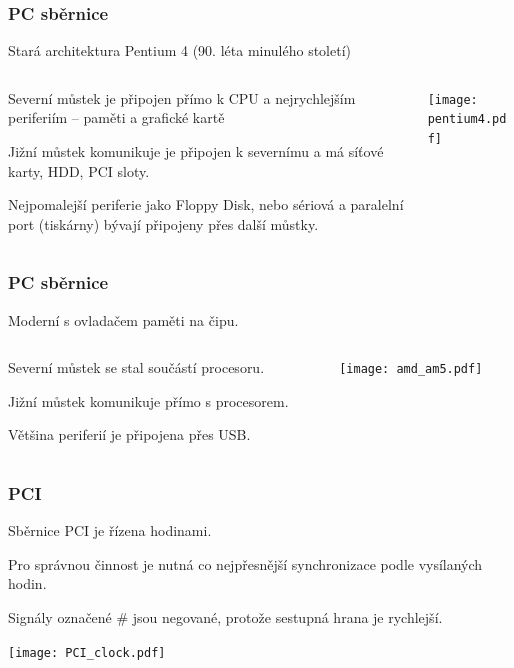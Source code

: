 \documentclass{beamer}
\begin{document}
\begin{frame}
\frametitle{PC sběrnice}
\begin{center}
Stará architektura Pentium 4 (90. léta minulého století)
\end{center}

\begin{columns}
\begin{column}{0.5\textwidth}
Severní můstek je připojen přímo k CPU a nejrychlejším periferiím -- paměti a grafické kartě
\bigskip

Jižní můstek komunikuje je připojen k severnímu a má síťové karty, HDD, PCI sloty.

\bigskip
Nejpomalejší periferie jako Floppy Disk, nebo sériová a paralelní port (tiskárny) bývají připojeny přes další můstky.
\end{column}
\begin{column}{0.5\textwidth}  
\texttt{[image: pentium4.pdf]}
\end{column}
\end{columns}
\end{frame}

\begin{frame}
\frametitle{PC sběrnice}

\begin{center}
Moderní s ovladačem paměti na čipu.
\end{center}

\begin{columns}
\begin{column}{0.4\textwidth}
Severní můstek se stal součástí procesoru.

\bigskip
Jižní můstek komunikuje přímo s procesorem.

\bigskip
Většina periferií je připojena přes USB.
\end{column}
\begin{column}{0.6\textwidth}  
\texttt{[image: amd\_am5.pdf]}
\end{column}
\end{columns}
\end{frame}

\begin{frame}
\frametitle{PCI}

Sběrnice PCI je řízena hodinami. 

Pro správnou činnost je nutná co nejpřesnější synchronizace podle vysílaných hodin.

Signály označené \# jsou negované, protože sestupná hrana je rychlejší.

\begin{center}  
\texttt{[image: PCI\_clock.pdf]}
\end{center}
\end{frame}
\end{document}
